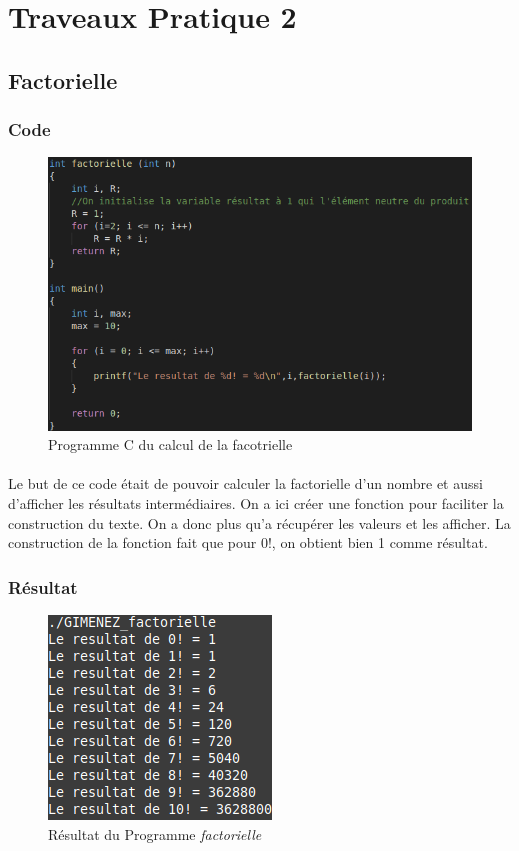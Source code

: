 \documentclass[10pt,a4paper]{article}
\begin{document}
\section{Traveaux Pratique 2}

\subsection{Factorielle}
\subsubsection{Code}
	\begin{figure}[h]
	\begin{center}
	\includegraphics[scale=.3]{images/factorielle_c}
	\end{center}
	\caption{Programme C du calcul de la facotrielle}
	\end{figure}
\paragraph{}
	Le but de ce code était de pouvoir calculer la factorielle d'un nombre et aussi d'afficher les résultats intermédiaires. 
	On a ici créer une fonction pour faciliter la construction du texte. On a donc plus qu'a récupérer les valeurs et les afficher.
	La construction de la fonction fait que pour 0!, on obtient bien 1 comme résultat.
\pagebreak
\subsubsection{Résultat}
	\begin{figure}[h]
	\begin{center}
	\includegraphics[scale=.3]{images/factorielle_ex}
	\end{center}
	\caption{Résultat du Programme \emph{factorielle}}
	\end{figure}
\end{document}
